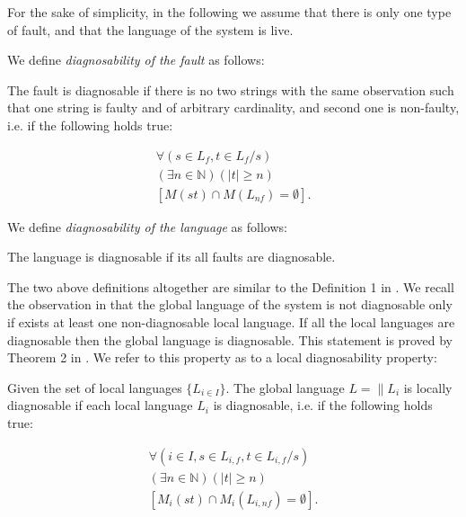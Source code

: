 \documentclass[a4paper, 10pt, conference]{ieeeconf}
\begin{document}
For the sake of simplicity, in the following we assume that there is only one
type of fault, and that the language of the system is live.

We define \emph{diagnosability of the fault} as follows:
\begin{definition} 
\label{def:fault_is_diag}
The fault is diagnosable if there is no two strings
with the same observation such that one string is faulty and of arbitrary
cardinality, and second one is non-faulty, i.e. if the following holds true:
\end{definition}
\begin{equation}
\begin{array}{l}
	\forall(s \in L_f, t \in L_f/s) 
	\\
	(\exists n \in \mathbb{N})
	(|t| \geq n) 
	\\
	\left[ M(st) \cap M(L_{nf}) = \emptyset \right].
\end{array}
\end{equation}

We define \emph{diagnosability of the language} as follows:
\begin{definition}
The language is diagnosable if its all faults are diagnosable.
\end{definition}
The two above definitions altogether are similar to the Definition 1 in
\cite{sampath_diagnosability_1995}. We recall the observation in
\cite{contant_diagnosability_2006} that the global language of the system is not
diagnosable only if exists at least one non-diagnosable local language.
If all the local languages are diagnosable then the global language is
diagnosable. This statement is proved by Theorem 2 in
\cite{contant_diagnosability_2006}. We refer to this property as to a local
diagnosability property:

\begin{definition} Given the set of local languages
$\{L_{i \in I}\}$. The global language $L = \parallel L_i$ is
locally diagnosable if each local language $L_i$ is diagnosable, i.e. if
the following holds true:
\end{definition}
\begin{equation}
\begin{array}{l}
	\forall(i \in I, s \in L_{i,f}, t \in L_{i,f}/s)
	\\
	(\exists n \in \mathbb{N})
	(|t| \geq n)
	\\
	\left[ M_i(st) \cap M_i(L_{i,nf}) = \emptyset \right].
\end{array}
\end{equation}
\end{document}
